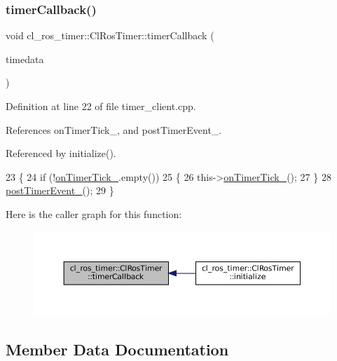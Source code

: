 \subsubsection{\texorpdfstring{timer\+Callback()}{timerCallback()}}
{\footnotesize\ttfamily void cl\+\_\+ros\+\_\+timer\+::\+Cl\+Ros\+Timer\+::timer\+Callback (\begin{DoxyParamCaption}\item[{const ros\+::\+Timer\+Event \&}]{timedata }\end{DoxyParamCaption})\hspace{0.3cm}{\ttfamily [protected]}}



Definition at line 22 of file timer\+\_\+client.\+cpp.



References on\+Timer\+Tick\+\_\+, and post\+Timer\+Event\+\_\+.



Referenced by initialize().


\begin{DoxyCode}
23 \{
24     \textcolor{keywordflow}{if} (!\hyperlink{classcl__ros__timer_1_1ClRosTimer_a2fcaab287b6ee13f6cc689876c6d28fa}{onTimerTick\_}.empty())
25     \{
26         this->\hyperlink{classcl__ros__timer_1_1ClRosTimer_a2fcaab287b6ee13f6cc689876c6d28fa}{onTimerTick\_}();
27     \}
28     \hyperlink{classcl__ros__timer_1_1ClRosTimer_af502ca54355f50d19d4aa6ca5f4e0c23}{postTimerEvent\_}();
29 \}
\end{DoxyCode}
Here is the caller graph for this function\+:
\nopagebreak
\begin{figure}[H]
\begin{center}
\leavevmode
\includegraphics[width=350pt]{classcl__ros__timer_1_1ClRosTimer_a047720c2f37e354e0867b148c85e18e3_icgraph}
\end{center}
\end{figure}


\subsection{Member Data Documentation}
\mbox{\label{classcl__ros__timer_1_1ClRosTimer_a39a5666044409eca94562fcceca8b0ea}} 
